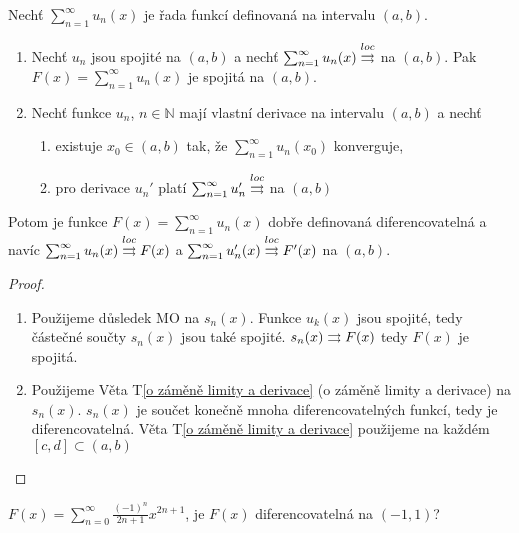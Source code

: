\begin{vetal}
\label{o spojitosti a derivování řad funkcí}
Nechť $\sum_{n=1}^{\infty} u_n (x)$ je řada funkcí definovaná na intervalu $(a,b)$.
\begin{enumerate}
\item Nechť $u_n$ jsou spojité na $(a,b)$ a nechť $\sum_{n=1}^{\infty} u_n (x) \overset{loc}{\rightrightarrows}$ na $(a,b)$. Pak $F (x) = \sum_{n=1}^{\infty} u_n (x)$ je spojitá na $(a,b)$.
\item Nechť funkce $u_n$, $n \in \mathbb{N}$ mají vlastní derivace na intervalu $(a,b)$ a nechť
	\begin{enumerate}
	\item existuje $x_0 \in (a,b)$ tak, že $\sum_{n=1}^{\infty} u_n (x_0)$ konverguje,
	\item pro derivace $u_n'$ platí $\sum_{n=1}^{\infty} u_n' \overset{loc}{\rightrightarrows}$ na $(a,b)$
	\end{enumerate}
\end{enumerate}
Potom je funkce $F(x) = \sum_{n=1}^{\infty} u_n (x)$ dobře definovaná diferencovatelná a navíc $\sum_{n=1}^{\infty} u_n (x) \overset{loc}{\rightrightarrows} F(x)$ a $\sum_{n=1}^{\infty} u'_n (x) \overset{loc}{\rightrightarrows} F'(x)$ na $(a,b)$.
\end{vetal}
\begin{proof}
\begin{enumerate}

\item Použijeme důsledek MO na $s_n(x) $. Funkce $u_k(x)$ jsou spojité, tedy částečné součty $s_n(x)$ jsou také spojité. $s_n(x) \rightrightarrows F(x)$ tedy $F(x)$ je spojitá.
\item Použijeme Věta T\ref{o záměně limity a derivace} (o záměně limity a derivace) na $s_n(x)$. $s_n(x)$ je součet konečně mnoha diferencovatelných funkcí, tedy je diferencovatelná. Věta T\ref{o záměně limity a derivace} použijeme na každém $[c,d] \subset (a,b)$
\end{enumerate}
\end{proof}

\begin{priklad}
$F(x) = \sum_{n=0}^\infty \frac{(-1)^n}{2n+1} x^{2n+1}$, je $F(x)$ diferencovatelná na $(-1,1)$?
\end{priklad}

